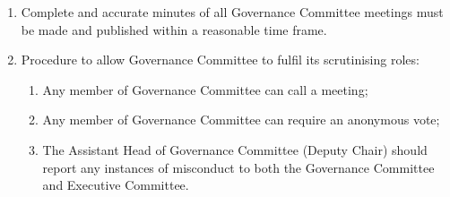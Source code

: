 \documentclass[12pt]{article}
\begin{document}
\begin{enumerate}
\begin{enumerate}
    \end{enumerate}
    \item Complete and accurate minutes of all Governance Committee meetings must be made and published within a reasonable time frame.
    \item Procedure to allow Governance Committee to fulfil its scrutinising roles:
    \begin{enumerate}
        \item Any member of Governance Committee can call a meeting;
        \item Any member of Governance Committee can require an anonymous vote;
        \item The Assistant Head of Governance Committee (Deputy Chair) should report any instances of misconduct to both the Governance Committee and Executive Committee.
    \end{enumerate}
\end{enumerate}
\end{document}
